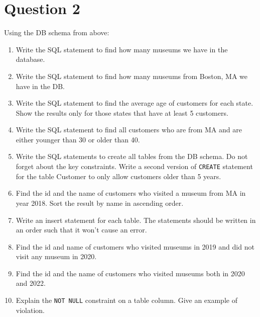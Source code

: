 \documentclass[letterpaper, 11pt]{article}
\begin{document}
\section*{Question 2}

Using the DB schema from above:
\begin{enumerate}[leftmargin=*]
    \item Write the SQL statement to find how many museums we have in the database.
    \item Write the SQL statement to find how many museums from Boston, MA we have in the DB.
    \item Write the SQL statement to find the average age of customers for each state. Show the results only for those states that have at least 5 customers.
    \item Write the SQL statement to find all customers who are from MA and are either younger than 30 or older than 40.
    \item Write the SQL statements to create all tables from the DB schema. Do not forget about the key constraints. Write a second version of \texttt{CREATE} statement for the table Customer to only allow customers older than 5 years.
    \item Find the id and the name of customers who visited a museum from MA in year 2018. Sort the result by name in ascending order.
    \item Write an insert statement for each table. The statements should be written in an order such that it won’t cause an error.
    \item Find the id and name of customers who visited museums in 2019 and did not visit any museum in 2020.
    \item Find the id and the name of customers who visited museums both in 2020 and 2022.
    \item Explain the \texttt{NOT NULL} constraint on a table column. Give an example of violation.


\end{enumerate}
\end{document}
